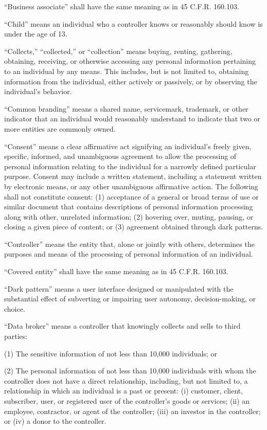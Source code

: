 “Business associate” shall have the same meaning as in 45 C.F.R. 160.103.

“Child” means an individual who a controller knows or reasonably should know is under the age of 13. 

“Collects,” “collected,” or “collection” means buying, renting, gathering, obtaining, receiving, or otherwise accessing any personal information pertaining to an individual by any means. This includes, but is not limited to, obtaining information from the individual, either actively or passively, or by observing the individual’s behavior.

“Common branding” means a shared name, servicemark, trademark, or other indicator that an individual would reasonably understand to indicate that two or more entities are commonly owned.

“Consent” means a clear affirmative act signifying an individual’s freely given, specific, informed, and unambiguous agreement to allow the processing of personal information relating to the individual for a narrowly defined particular purpose. Consent may include a written statement, including a statement written by electronic means, or any other unambiguous affirmative action. The following shall not constitute consent: (1) acceptance of a general or broad terms of use or similar document that contains descriptions of personal information processing along with other, unrelated information; (2) hovering over, muting, pausing, or closing a given piece of content; or (3) agreement obtained through dark patterns.

“Controller” means the entity that, alone or jointly with others, determines the purposes and means of the processing of personal information of an individual.

“Covered entity” shall have the same meaning as in 45 C.F.R. 160.103.

“Dark pattern” means a user interface designed or manipulated with the substantial effect of subverting or impairing user autonomy, decision-making, or choice.

“Data broker” means a controller that knowingly collects and sells to third parties:

(1) The sensitive information of not less than 10,000 individuals; or

(2) The personal information of not less than 10,000 individuals with whom the controller does not have a direct relationship, including, but not limited to, a relationship in which an individual is a past or present: (i) customer, client, subscriber, user, or registered user of the controller’s goods or services; (ii) an employee, contractor, or agent of the controller; (iii) an investor in the controller; or (iv) a donor to the controller.

